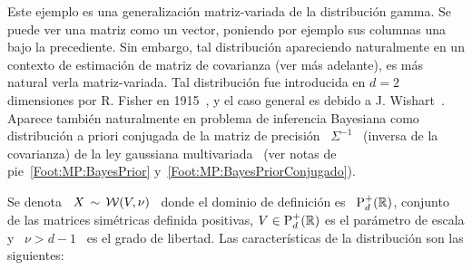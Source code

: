 \label{Sssec:MP:Wishart}

Este ejemplo es una  generalizaci\'on matriz-variada de la distribuci\'on gamma.
Se puede  ver una matriz como un  vector, poniendo por ejemplo  sus columnas una
bajo la  precediente.  Sin embargo, tal  distribuci\'on apareciendo naturalmente
en un contexto de estimaci\'on de  matriz de covarianza (ver m\'as adelante), es
m\'as natural verla matriz-variada.  Tal distribuci\'on fue introducida en $d=2$
dimensiones por R. Fisher en 1915~\cite{Fis15}, y el caso general es debido a J.
Wishart~\cite{Wis28,   Mui82,  BilBre99,   GupNag99,  And03,   Seb04}.   Aparece
tambi\'en naturalmente en problema de inferencia Bayesiana como distribuci\'on a
priori conjugada  de la matriz de  precisi\'on \ $\Sigma^{-1}$ \  (inversa de la
covarianza)  de  la  ley gaussiana  multivariada~\cite[Ec.~(4.4.5)]{Rob07}  (ver
notas de pie~\ref{Foot:MP:BayesPrior} y~\ref{Foot:MP:BayesPriorConjugado}).

Se denota  \ $X \, \sim  \, \mathcal{W}(V,\nu)$ \ donde  el dominio de  definici\'on es \
$\mathrm{P}_d^+(\mathbb{R})$, conjunto de las  matrices sim\'etricas definida positivas, $V
\in \mathrm{P}_d^+(\mathbb{R})$ es el  par\'ametro de escala y \ $\nu >  d-1$ \ es el grado
de libertad.  Las caracter\'isticas de la distribuci\'on son las siguientes:

